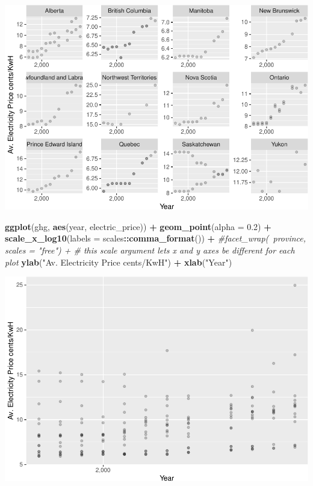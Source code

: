 \documentclass[]{article}
\newenvironment{Shaded}{\begin{snugshade}}{\end{snugshade}}
\newcommand{\CommentTok}[1]{\textcolor[rgb]{0.56,0.35,0.01}{\textit{#1}}}
\newcommand{\DataTypeTok}[1]{\textcolor[rgb]{0.13,0.29,0.53}{#1}}
\newcommand{\FloatTok}[1]{\textcolor[rgb]{0.00,0.00,0.81}{#1}}
\newcommand{\KeywordTok}[1]{\textcolor[rgb]{0.13,0.29,0.53}{\textbf{#1}}}
\newcommand{\NormalTok}[1]{#1}
\newcommand{\OperatorTok}[1]{\textcolor[rgb]{0.81,0.36,0.00}{\textbf{#1}}}
\newcommand{\StringTok}[1]{\textcolor[rgb]{0.31,0.60,0.02}{#1}}
\begin{document}
\includegraphics{hw05_files/figure-latex/unnamed-chunk-7-1.pdf}

\begin{Shaded}
\begin{Highlighting}[]
\KeywordTok{ggplot}\NormalTok{(ghg, }\KeywordTok{aes}\NormalTok{(year, electric_price)) }\OperatorTok{+}
\StringTok{  }\KeywordTok{geom_point}\NormalTok{(}\DataTypeTok{alpha =} \FloatTok{0.2}\NormalTok{) }\OperatorTok{+}
\StringTok{  }\KeywordTok{scale_x_log10}\NormalTok{(}\DataTypeTok{labels =}\NormalTok{ scales}\OperatorTok{::}\KeywordTok{comma_format}\NormalTok{()) }\OperatorTok{+}
\StringTok{  }\CommentTok{#facet_wrap(~province, scales = "free") + # this scale argument lets x and y axes be different for each plot}
\StringTok{   }\KeywordTok{ylab}\NormalTok{(}\StringTok{"Av. Electricity Price cents/KwH"}\NormalTok{) }\OperatorTok{+}\StringTok{ }\KeywordTok{xlab}\NormalTok{(}\StringTok{"Year"}\NormalTok{)}
\end{Highlighting}
\end{Shaded}

\includegraphics{hw05_files/figure-latex/unnamed-chunk-7-2.pdf}
\end{document}
